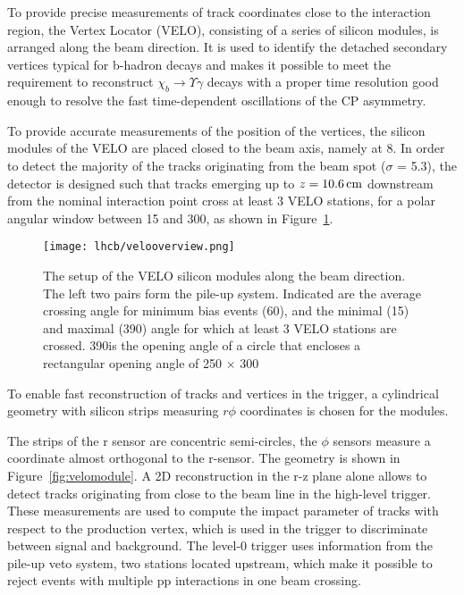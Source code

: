 To provide precise measurements of track coordinates close to the interaction 
region, the Vertex Locator (VELO), consisting of a series of silicon modules, 
is arranged along the beam direction. It is used to identify the detached 
secondary vertices typical for b-hadron decays and makes it possible to meet 
the requirement to reconstruct $\chi_b \rightarrow \Upsilon \gamma$ decays
with a proper time resolution good enough to resolve the fast time-dependent
oscillations of the CP asymmetry.

To provide accurate measurements of the position of the vertices, the silicon
modules of the VELO are placed closed to the beam axis, namely at 8\mm.
In order to detect the majority of the tracks originating
from the beam spot ($\sigma$ = 5.3\cm), the detector is designed such that
tracks emerging up to $z = 10.6\rm \,cm$ downstream from the nominal interaction
point cross at least 3 VELO stations, for a polar angular window between 15
and 300\mrad, as shown in Figure~\ref{fig:velooverview}.

\begin{figure}[tb]
\begin{center}
\texttt{[image: lhcb/velooverview.png]}
\end{center}
\caption{\small The setup of the VELO silicon modules along the beam direction.
The left two pairs form the pile-up system. Indicated are the average crossing
angle for minimum bias events (60\mrad), and the minimal (15\mrad) and
maximal (390\mrad) angle for which at least 3 VELO stations are crossed.
390\mrad is the opening angle of a circle that encloses a rectangular opening
angle of 250 $\times$ 300\mrad}
\label{fig:velooverview}
\end{figure}

To enable fast reconstruction of tracks and vertices in the \lhcb trigger,
a cylindrical geometry with silicon strips measuring $r\phi$ coordinates is
chosen for the modules.

The strips of the r sensor are concentric semi-circles, the $\phi$ sensors 
measure a coordinate almost orthogonal to the r-sensor. The geometry is shown in
Figure~\ref{fig:velomodule}. A 2D reconstruction in the r-z plane alone allows to
detect tracks originating from close to the beam line in the high-level trigger.
These measurements are used to compute the impact parameter of tracks with
respect to the production vertex, which is used in the trigger to discriminate 
between signal and background. The level-0 trigger uses information from the
pile-up veto system, two stations located upstream, which make it possible to
reject events with multiple pp interactions in one beam crossing.

